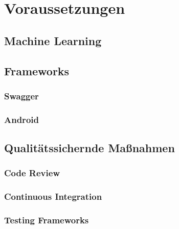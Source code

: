 \chapter{Voraussetzungen}

	\section{Machine Learning}
	
	\section{}

	\section{Frameworks}
	  		
		\subsection{Swagger}
		
		\subsection{Android}
		
	\section{Qualitätssichernde Maßnahmen}
	
		\subsection{Code Review}
		
	
		\subsection{Continuous Integration}
		
		\subsection{Testing Frameworks}
		
	